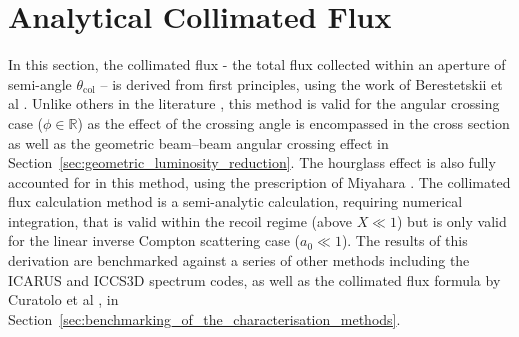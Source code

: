 \documentclass[../main.tex]{subfiles}
\begin{document}
\section{Analytical Collimated Flux}
\label{sec:analytical_collimated_flux}

In this section, the collimated flux - the total flux collected within an aperture of semi-angle $\theta_{\mathrm{col}}$ -- is derived from first principles, using the work of Berestetskii et al \cite{berestetskii1982quantum}. Unlike others in the literature \cite{curatolo2017analytical}, this method is valid for the angular crossing case ($\phi\in\mathbb{R}$) as the effect of the crossing angle is encompassed in the cross section as well as the geometric beam--beam angular crossing effect in Section~\ref{sec:geometric_luminosity_reduction}. The hourglass effect is also fully accounted for in this method, using the prescription of Miyahara \cite{miyahara2008luminosity}. The collimated flux calculation method is a semi-analytic calculation, requiring numerical integration, that is valid within the recoil regime (above $X\ll1$) but is only valid for the linear inverse Compton scattering case ($a_{0}\ll1$). The results of this derivation are benchmarked against a series of other methods including the \textsc{ICARUS} and \textsc{ICCS3D} spectrum codes, as well as the collimated flux formula by Curatolo et al \cite{curatolo2017analytical}, in Section~\ref{sec:benchmarking_of_the_characterisation_methods}.
\end{document}
